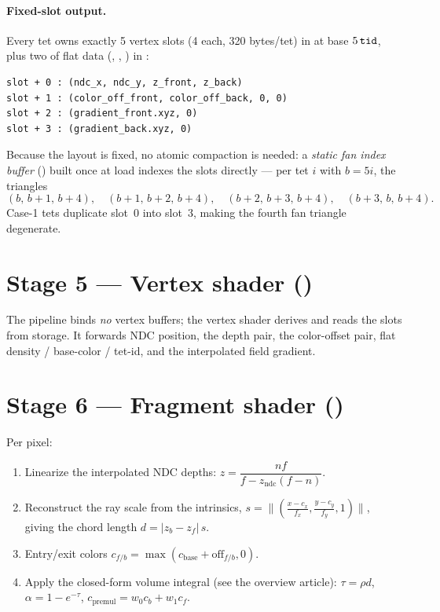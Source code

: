 \paragraph{Fixed-slot output.} Every tet owns exactly 5 vertex slots
(4  each, 320 bytes/tet) in  at base
$5\,\code{tid}$, plus two  of flat data
(, , ) in
:
\begin{lstlisting}
slot + 0 : (ndc_x, ndc_y, z_front, z_back)
slot + 1 : (color_off_front, color_off_back, 0, 0)
slot + 2 : (gradient_front.xyz, 0)
slot + 3 : (gradient_back.xyz, 0)
\end{lstlisting}
Because the layout is fixed, no atomic compaction is needed: a \emph{static
fan index buffer} () built once at load indexes
the slots directly --- per tet $i$ with $b = 5i$, the triangles
\[
(b,\,b{+}1,\,b{+}4),\quad (b{+}1,\,b{+}2,\,b{+}4),\quad
(b{+}2,\,b{+}3,\,b{+}4),\quad (b{+}3,\,b,\,b{+}4).
\] Case-1 tets duplicate slot~0 into slot~3, making
the fourth fan triangle degenerate.

\section{Stage 5 --- Vertex shader ()}

The pipeline binds \emph{no} vertex buffers; the vertex shader derives
 and reads the slots from storage. It forwards
NDC position, the depth pair, the color-offset pair, flat density /
base-color / tet-id, and the interpolated field gradient.

\section{Stage 6 --- Fragment shader ()}

Per pixel:
\begin{enumerate}
\item Linearize the interpolated NDC depths:
  $z = \dfrac{n f}{f - z_{\text{ndc}}(f - n)}$.
\item Reconstruct the ray scale from the intrinsics,
  $s = \lVert(\frac{x-c_x}{f_x}, \frac{y-c_y}{f_y}, 1)\rVert$, giving the
  chord length $d = |z_b - z_f|\, s$.
\item Entry/exit colors $c_{f/b} = \max(c_{\text{base}} + \text{off}_{f/b}, 0)$.
\item Apply the closed-form volume integral (see the overview article):
  $\tau = \rho d$, $\alpha = 1 - e^{-\tau}$,
  $c_{\text{premul}} = w_0 c_b + w_1 c_f$.
\end{enumerate}

